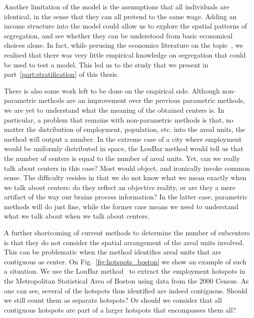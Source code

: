Another limitation of the model is the assumptions that all individuals are
identical, in the sense that they can all pretend to the same wage. Adding an
income structure into the model could allow us to explore the spatial patterns
of segregation, and see whether they can be understood from basic economical
choices alone. In fact, while perusing the economics literature on the
topic~\cite{Glaeser:2008, Brueckner:1999}, we realised that there was very little
empirical knowledge on segregation that could be used to test a model. This led
us to the study that we present in part~\ref{part:stratification} of this
thesis.\\

\medskip

There is also some work left to be done on the empirical side. Although
non-parametric methods are an improvement over the previous parametric methods,
we are yet to understand what the meaning of the obtained centers is. In
particular, a problem that remains with non-parametric methods is that, no
matter the distribution of employment, population, etc. into the areal units,
the method will output a number. In the extreme case of a city where employment
would be uniformly distributed in space, the LouBar method would tell us that
the number of centers is equal to the number of areal units. Yet, can we really
talk about centers in this case? Most would object, and ironically invoke common
sense. The difficulty resides in that we do not know what we mean exactly when
we talk about centers: do they reflect an objective reality, or are they a mere
artifact of the way our brains process information? In the latter case,
parametric methods will do just fine, while the former case means we need to
understand what we talk about when we talk about centers.  

A further shortcoming of current methods to determine the number of subcenters
is that they do not consider the spatial arrangement of the areal units
involved. This can be problematic when the method identifies areal units that
are contiguous as center. On Fig.~\ref{fig:hotspots_boston} we show an example
of such a situation. We use the LouBar method~\cite{Louail:2014} to extract the
employment hotspots in the Metropolitan Statistical Area of Boston using data
from the 2000 Census. As one can see, several of the hotspots thus identified
are indeed contiguous. Should we still count them as separate hotspots? Or
should we consider that all contiguous hotspots are part of a larger hotspots
that encompasses them all? 

